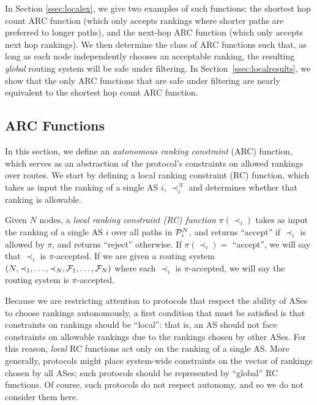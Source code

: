 In Section \ref{ssec:localex}, we give two examples of such
functions: the shortest hop count ARC function (which only accepts
rankings where shorter paths are preferred to longer paths), and the
next-hop ARC function (which only accepts next hop rankings).  We then
determine the class of ARC functions such that, as long as each
node independently chooses an acceptable ranking, the resulting
{\em global} routing system will be safe under
filtering.  In Section~\ref{ssec:localresults},
we show that the only ARC functions that are safe under filtering are
nearly equivalent to the shortest hop count ARC function.

\subsection{ARC Functions}
\label{ssec:local}

In this section, we define an {\em autonomous ranking constraint}
(ARC) function, which serves as an abstraction of the protocol's
constraints on allowed rankings over routes.  We start by defining a
local ranking constraint (RC) function, which takes as input the ranking of
a single AS $i$, $\prec_i^N$ and determines whether that 
ranking is allowable.

\begin{defn}
Given $N$ nodes, a {\em local ranking constraint (RC) function}
$\pi(\prec_i)$ takes as input the ranking of a single AS $i$ over all
paths in $\P_i^N$, and returns ``accept'' if $\prec_i$ is allowed by
$\pi$, and returns ``reject'' otherwise.  If $\pi(\prec_i) =$
``accept'', we will say that $\prec_i$ is $\pi$-accepted.  If we are
given a routing system $(N, \prec_1, \ldots, \prec_N, \F_1, \ldots,
\F_N)$ where each $\prec_i$ is $\pi$-accepted, we will say the routing
system is $\pi$-accepted.
\end{defn}

Because we are restricting attention to protocols that respect the
ability of ASes to choose rankings autonomously, a first condition
that must be satisfied is that constraints on rankings should be
``local'': that is, an AS should not face constraints on allowable
rankings due to the rankings chosen by other ASes.  For this reason,
{\em local} RC functions act only on the ranking of a single AS.  More
generally, protocols might place system-wide constraints on the vector
of rankings chosen by all ASes; such protocols should be represented
by ``global'' RC functions.  Of course, such protocols do not
respect autonomy, and so we do not consider them here.

